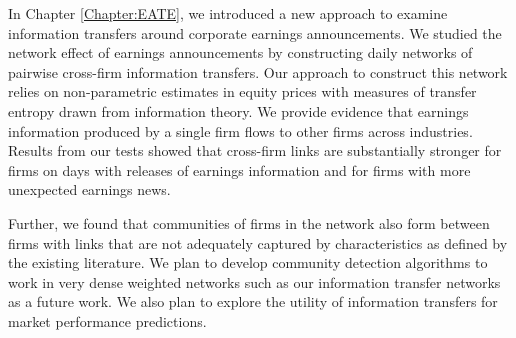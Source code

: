 
In Chapter \ref{Chapter:EATE}, we introduced a new approach to examine information transfers around corporate earnings announcements.  We studied the network effect of earnings announcements by constructing daily networks of pairwise cross-firm information transfers. Our approach to construct this network relies on non-parametric estimates in equity prices with measures of transfer entropy drawn from information theory.  We provide evidence that earnings information produced by a single firm flows to other firms across industries.  Results from our tests showed that cross-firm links are substantially stronger for firms on days with releases of earnings information and for firms with more unexpected earnings news.


Further,  we found that communities of firms in the network also form between firms with links that are not adequately captured by characteristics as defined by the existing literature.  We plan to develop community detection algorithms to work in very dense weighted networks such as our information transfer networks as a  future work.  We also plan to explore the utility of information transfers for market performance predictions.



%
%


